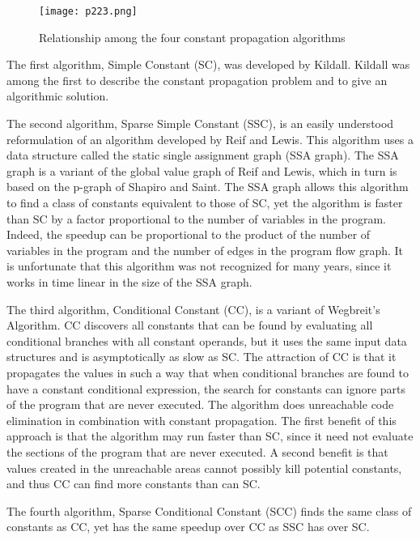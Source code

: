 \begin{figure}[H]
	\centering
	\texttt{[image: p223.png]}
	\caption{Relationship among the four constant propagation algorithms}
	\label{fig:p223}

\end{figure}


The first algorithm, Simple Constant (SC), was developed by Kildall\cite{kildall1973unified}. 
Kildall was among the first to describe the
constant propagation problem and to give an algorithmic solution.



The second algorithm, Sparse Simple Constant (SSC), is an easily understood reformulation of an algorithm developed by Reif and Lewis\cite{reif1977symbolic}. 
This algorithm uses a data
structure called the static single assignment graph (SSA graph). The SSA
graph is a variant of the global value graph of Reif and Lewis, which in
turn is based on the p-graph of Shapiro and Saint. The SSA graph allows
this algorithm to find a class of constants equivalent to those of SC, yet the
algorithm is faster than SC by a factor proportional to the number of
variables in the program. Indeed, the speedup can be proportional to the
product of the number of variables in the program and the number of edges
in the program flow graph. It is unfortunate that this algorithm was not
recognized for many years, since it works in time linear in the size of the SSA
graph.


The third algorithm, Conditional Constant (CC), is a variant of Wegbreit’s
Algorithm\cite{wegbreit1975property}. CC discovers all constants
that can be found by evaluating all conditional branches with all constant
operands, but it uses the same input data structures and is asymptotically as
slow as SC. The attraction of CC is that it propagates the values in such a
way that when conditional branches are found to have a constant conditional
expression, the search for constants can ignore parts of the program that are
never executed. The algorithm does unreachable code elimination in combination with constant propagation. 
The first benefit of this approach is that
the algorithm may run faster than SC, since it need not evaluate the sections
of the program that are never executed. A second benefit is that values
created in the unreachable areas cannot possibly kill potential constants, and
thus CC can find more constants than can SC.

The fourth algorithm, Sparse Conditional Constant (SCC) finds the same class of constants as CC, yet has
the same speedup over CC as SSC has over SC.


